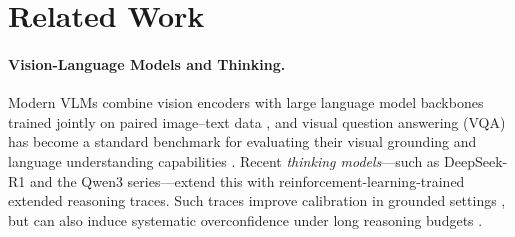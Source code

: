 \documentclass[letterpaper]{article}
\begin{document}
\section{Related Work}

\paragraph{Vision-Language Models and Thinking.}
Modern VLMs combine vision encoders with large language model backbones trained
jointly on paired image--text data \citep{liu2023visual,zhang2023multimodal}, and
visual question answering (VQA) has become a standard benchmark for evaluating their
visual grounding and language understanding capabilities \citep{antol2015vqa,goyal2016making}.
Recent \emph{thinking models}---such as DeepSeek-R1 \citep{deepseekai2025deepseekr1}
and the Qwen3 series---extend this with reinforcement-learning-trained extended
reasoning traces. Such traces improve calibration in grounded settings
\citep{yoon2025reasoningconfidence}, but can also induce systematic overconfidence
under long reasoning budgets \citep{lacombe2025dontthink}.
\end{document}
